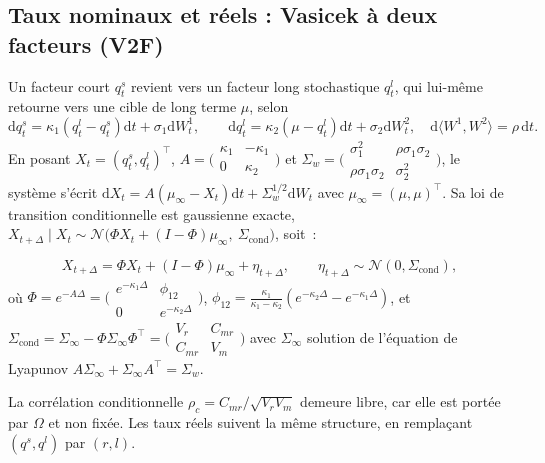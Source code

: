 \documentclass[11pt,a4paper]{article}
\theoremstyle{definition}
\newcommand{\Ncal}{\mathcal{N}}
\newcommand{\transp}{^{\!\top}}
\newcommand{\dd}{\mathrm{d}}
\newcommand{\Dt}{\Delta}
\begin{document}
\subsection{Taux nominaux et réels : Vasicek à deux facteurs (V2F)}
\label{sec:v2f}
Un facteur court $q^s_t$ revient vers un facteur long stochastique $q^l_t$, qui lui-même retourne vers une cible de long terme $\mu$, selon
\[
\dd q^s_t=\kappa_1(q^l_t-q^s_t)\dd t+\sigma_1\dd W^1_t,\qquad
\dd q^l_t=\kappa_2(\mu-q^l_t)\dd t+\sigma_2\dd W^2_t,\quad \dd\langle W^1,W^2\rangle=\rho\,\dd t .
\]
En posant $X_t=(q^s_t,q^l_t)\transp$, $A=\bigl(\begin{smallmatrix}\kappa_1&-\kappa_1\\0&\kappa_2\end{smallmatrix}\bigr)$ et $\Sigma_w=\bigl(\begin{smallmatrix}\sigma_1^2&\rho\sigma_1\sigma_2\\\rho\sigma_1\sigma_2&\sigma_2^2\end{smallmatrix}\bigr)$, le système s'écrit $\dd X_t=A(\mu_\infty-X_t)\dd t+\Sigma_w^{1/2}\dd W_t$ avec $\mu_\infty=(\mu,\mu)\transp$. Sa loi de transition conditionnelle est gaussienne exacte, $X_{t+\Dt}\mid X_t\sim\Ncal\big(\Phi X_t+(I-\Phi)\mu_\infty,\ \Sigma_{\mathrm{cond}}\big)$, soit~:
\begin{definitionbox}
\[
X_{t+\Dt}=\Phi X_t+(I-\Phi)\mu_\infty+\eta_{t+\Dt},\qquad \eta_{t+\Dt}\sim\Ncal(0,\Sigma_{\mathrm{cond}}),
\]
où $\Phi=e^{-A\Dt}=\bigl(\begin{smallmatrix}e^{-\kappa_1\Dt}&\phi_{12}\\0&e^{-\kappa_2\Dt}\end{smallmatrix}\bigr)$, $\phi_{12}=\tfrac{\kappa_1}{\kappa_1-\kappa_2}(e^{-\kappa_2\Dt}-e^{-\kappa_1\Dt})$, et $\Sigma_{\mathrm{cond}}=\Sigma_\infty-\Phi\Sigma_\infty\Phi\transp=\bigl(\begin{smallmatrix}V_r&C_{mr}\\C_{mr}&V_m\end{smallmatrix}\bigr)$ avec $\Sigma_\infty$ solution de l'équation de Lyapunov $A\Sigma_\infty+\Sigma_\infty A\transp=\Sigma_w$.
\end{definitionbox}
\noindent La corrélation conditionnelle $\rho_c=C_{mr}/\sqrt{V_r V_m}$ demeure libre, car elle est portée par $\Omega$ et non fixée. Les taux réels suivent la même structure, en remplaçant $(q^s,q^l)$ par $(r,l)$.
\end{document}
